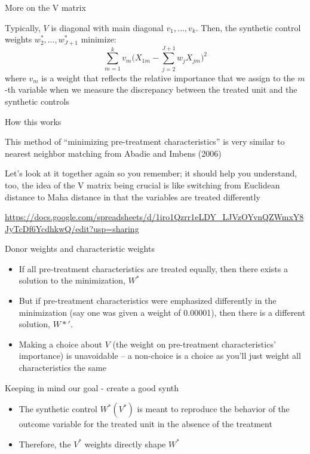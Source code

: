\documentclass{beamer}
\begin{document}
\begin{frame}{More on the V matrix}

Typically, $V$ is diagonal with main diagonal $v_1, \dots, v_k$.  Then, the synthetic control weights $w_2^*, \dots, w_{J+1}^*$ minimize: $$\sum_{m=1}^k v_m \bigg(X_{1m} - \sum_{j=2}^{J+1}w_jX_{jm}\bigg)^2$$ where $v_m$ is a weight that reflects the relative importance that we assign to the $m$-th variable when we measure the discrepancy between the treated unit and the synthetic controls

\end{frame}



\begin{frame}{How this works}

This method of ``minimizing pre-treatment characteristics'' is very similar to nearest neighbor matching from Abadie and Imbens (2006)

\bigskip

Let's look at it together again so you remember; it should help you understand, too, the idea of the V matrix being crucial is like switching from Euclidean distance to Maha distance in that the variables are treated differently

\bigskip

\url{https://docs.google.com/spreadsheets/d/1iro1Qzrr1eLDY_LJVzOYvnQZWmxY8JyTcDf6YcdhkwQ/edit?usp=sharing}

\end{frame}

\begin{frame}{Donor weights and characteristic weights}

\begin{itemize}
\item If all pre-treatment characteristics are treated equally, then there exists a solution to the minimization, $W^*$
\item But if pre-treatment characteristics were emphasized differently in the minimization (say one was given a weight of 0.00001), then there is a different solution, $W*'$.
\item Making a choice about $V$ (the weight on pre-treatment characteristics' importance) is unavoidable -- a non-choice is a choice as you'll just weight all characteristics the same
\end{itemize}

\end{frame}


\begin{frame}{Keeping in mind our goal - create a good synth}
	
		\begin{itemize}
		\item The synthetic control $W^*(V^*)$ is meant to reproduce the behavior of the outcome variable for the treated unit in the absence of the treatment
		\item Therefore, the $V^*$ weights directly shape $W^*$
		\end{itemize}
\end{frame}
\end{document}
